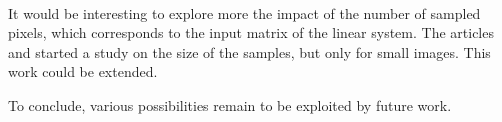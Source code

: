 \paragraph{}
It would be interesting to explore more the impact of the number of sampled pixels, which corresponds to the input matrix of the linear system.
The articles \cite{fowlkes_spectral_2004} and \cite{glide_2014} started a study on the size of the samples, but only for small images.
This work could be extended.

To conclude, various possibilities remain to be exploited by future work.
